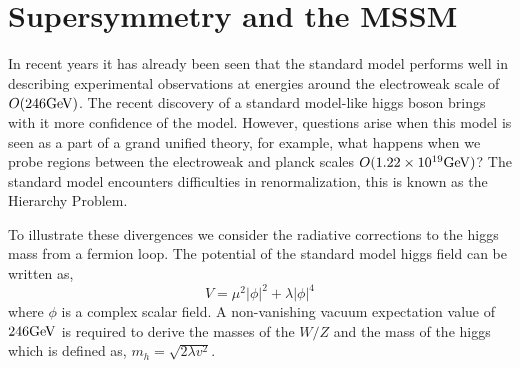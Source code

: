 \chapter{Supersymmetry and the MSSM}

In recent years it has already been seen that the standard model 
performs well in describing experimental observations at energies around
the electroweak scale of $O(246 \mathrm{GeV})$.
The recent discovery of a standard model-like higgs boson brings with it
more confidence of the model. However, questions arise when this model is seen as 
a part of a grand unified theory, for example, what happens when we probe
regions between the electroweak and planck scales $O(1.22 \times10^{19} \mathrm{GeV})$? 
The standard model encounters difficulties in renormalization, this is known
as the Hierarchy Problem.

To illustrate these divergences we consider the radiative corrections to the higgs mass
from a fermion loop.
The potential of the standard model higgs field can be
written as, 
\begin{equation}
V= \mu^{2}|\phi|^{2}+\lambda|\phi|^{4}
\end{equation}
where $\phi$ is a complex scalar field.
A non-vanishing vacuum expectation value of $246 \mathrm{GeV}$ is required to derive the masses of the $W/Z$
and the mass of the higgs which is defined as, $m_{h}=\sqrt{2\lambda v^{2}}$.


